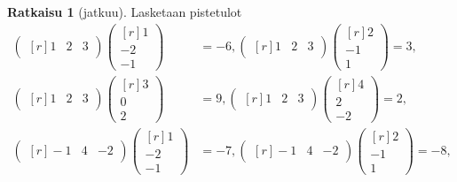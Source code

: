 \documentclass[12pt, a4paper, t]{beamer}
\theoremstyle{exercise}
\theoremstyle{remark}
\theoremstyle{definition}
\newtheorem*{rat}{Ratkaisu}
\begin{document}
\begin{frame}
\vspace{100pt}
\begin{rat}[jatkuu]
Lasketaan pistetulot
\begin{align*}
\begin{pmatrix*}[r]
1 & 2 &3
\end{pmatrix*}
\begin{pmatrix*}[r]
1\\
-2\\
-1
\end{pmatrix*}&=-6,
\begin{pmatrix*}[r]
1 & 2 &3
\end{pmatrix*}
\begin{pmatrix*}[r]
2\\
-1\\
1
\end{pmatrix*}=3,\\
\begin{pmatrix*}[r]
1 & 2 &3
\end{pmatrix*}
\begin{pmatrix*}[r]
3\\
0\\
2
\end{pmatrix*}&=9,
\begin{pmatrix*}[r]
1 & 2 &3
\end{pmatrix*}
\begin{pmatrix*}[r]
4\\
2\\
-2
\end{pmatrix*}= 2, \\
\begin{pmatrix*}[r]
-1 & 4 &-2
\end{pmatrix*}
\begin{pmatrix*}[r]
1\\
-2\\
-1
\end{pmatrix*}&=-7 ,
\begin{pmatrix*}[r]
-1 & 4 &-2
\end{pmatrix*}
\begin{pmatrix*}[r]
2\\
-1\\
1
\end{pmatrix*}=-8,\\
\end{align*}

\end{rat}

\end{frame}
\end{document}
